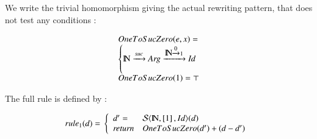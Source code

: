 We write the trivial homomorphism giving the actual rewriting pattern, that does not test any conditions :

$$
\begin{array}{lcl}
{OneToSucZero} (e,x)= \\
\left\{
 \mbox{${\rm I\!N}$} \xrightarrow{\scriptstyle {suc}} \mathit{Arg} \xrightarrow{\scriptstyle { \mbox{${\rm I\!N}$}\ensuremath{\xrightarrow{\scriptstyle {0}}} 1 }}  \mathit{Id}
\right. \\
 {OneToSucZero}(1) = \top 
\end{array}
$$

The full rule is defined by :

$$
rule_1 (d) =  \\
\left\{\begin{array}{ll}
d' = &  {\cal S}\langle {\mbox{${\rm I\!N}$},\left[1\right],Id} \rangle (d) \\
\mathit{return} &  OneToSucZero (d') + (d-d')
 \end{array}
\right. \\
$$
